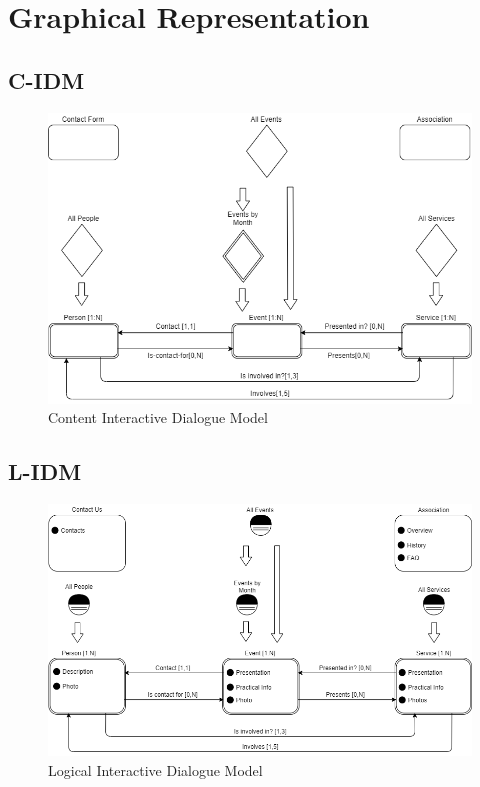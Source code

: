 \documentclass[11pt, a4paperm, hidelinks]{article}
\begin{document}
	\section{Graphical Representation}

	\subsection{C-IDM}
	\begin{figure}[h!]
		\centering
		\begin{minipage}[b]{1\textwidth}
    			\includegraphics[width=\textwidth]{./assets/C-IDM.png}
			\caption{Content Interactive Dialogue Model}
		\end{minipage}
	\end{figure}
	\FloatBarrier
	\clearpage

	\subsection{L-IDM}
	\begin{figure}[h!]
		\centering
		\begin{minipage}[b]{1\textwidth}
    			\includegraphics[width=\textwidth]{./assets/L-IDM.png}
			\caption{Logical Interactive Dialogue Model}
		\end{minipage}
	\end{figure}
\end{document}
